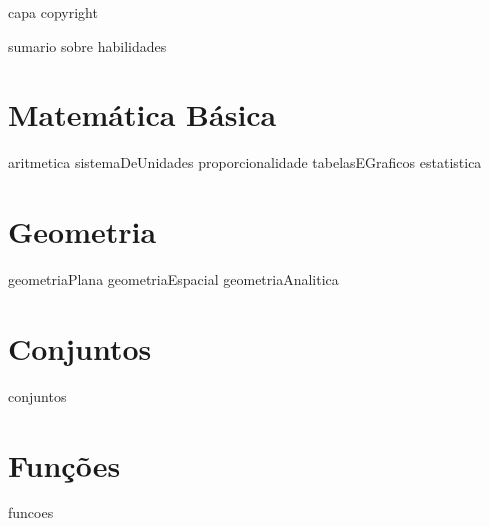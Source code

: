 \documentclass[11pt,fleqn]{book}
\begin{document}
{capa} %
{copyright} %

{sumario} %
{sobre} %
{habilidades} %

\part{Matemática Básica}
{aritmetica}
{sistemaDeUnidades}
{proporcionalidade}
{tabelasEGraficos}
{estatistica}

\part{Geometria}
{geometriaPlana}
{geometriaEspacial}
{geometriaAnalitica}

\part{Conjuntos}
{conjuntos}

\part{Funções}
{funcoes}
\end{document}
